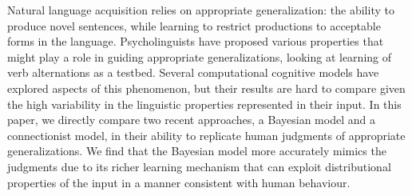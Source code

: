 Natural language acquisition relies on appropriate generalization: the ability to produce novel sentences, while learning to restrict productions to acceptable forms in the language. Psycholinguists have proposed various properties that might play a role in guiding appropriate generalizations, looking at learning of verb alternations as a testbed. Several computational cognitive models have explored aspects of this phenomenon, but their results are hard to compare given the high variability in the linguistic properties represented in their input. In this paper, we directly compare two recent approaches, a Bayesian model and a connectionist model, in their ability to replicate human judgments of appropriate generalizations. We find that the Bayesian model more accurately mimics the judgments due to its richer learning mechanism that can exploit distributional properties of the input in a manner consistent with human behaviour.
